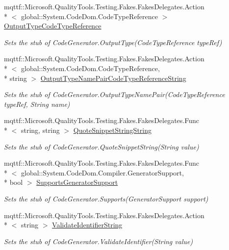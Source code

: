 \begin{DoxyCompactItemize}
mqttf\-::\-Microsoft.\-Quality\-Tools.\-Testing.\-Fakes.\-Fakes\-Delegates.\-Action\\*
$<$ global\-::\-System.\-Code\-Dom.\-Code\-Type\-Reference $>$ \hyperlink{class_system_1_1_code_dom_1_1_compiler_1_1_fakes_1_1_stub_code_generator_a0a58e6feed71b50cd8e9b8310b05abb4}{Output\-Type\-Code\-Type\-Reference}
\begin{DoxyCompactList}\small\item\em Sets the stub of Code\-Generator.\-Output\-Type(\-Code\-Type\-Reference type\-Ref)\end{DoxyCompactList}\item 
mqttf\-::\-Microsoft.\-Quality\-Tools.\-Testing.\-Fakes.\-Fakes\-Delegates.\-Action\\*
$<$ global\-::\-System.\-Code\-Dom.\-Code\-Type\-Reference, \\*
string $>$ \hyperlink{class_system_1_1_code_dom_1_1_compiler_1_1_fakes_1_1_stub_code_generator_ac08a49491b242ab94f3ce3cafc81c0b4}{Output\-Type\-Name\-Pair\-Code\-Type\-Reference\-String}
\begin{DoxyCompactList}\small\item\em Sets the stub of Code\-Generator.\-Output\-Type\-Name\-Pair(\-Code\-Type\-Reference type\-Ref, String name)\end{DoxyCompactList}\item 
mqttf\-::\-Microsoft.\-Quality\-Tools.\-Testing.\-Fakes.\-Fakes\-Delegates.\-Func\\*
$<$ string, string $>$ \hyperlink{class_system_1_1_code_dom_1_1_compiler_1_1_fakes_1_1_stub_code_generator_aca2ac1a9f86a09faaf78ca95bb4bb785}{Quote\-Snippet\-String\-String}
\begin{DoxyCompactList}\small\item\em Sets the stub of Code\-Generator.\-Quote\-Snippet\-String(\-String value)\end{DoxyCompactList}\item 
mqttf\-::\-Microsoft.\-Quality\-Tools.\-Testing.\-Fakes.\-Fakes\-Delegates.\-Func\\*
$<$ global\-::\-System.\-Code\-Dom.\-Compiler.\-Generator\-Support, \\*
bool $>$ \hyperlink{class_system_1_1_code_dom_1_1_compiler_1_1_fakes_1_1_stub_code_generator_a3c86c612640bd6b041dd1fea69d46b97}{Supports\-Generator\-Support}
\begin{DoxyCompactList}\small\item\em Sets the stub of Code\-Generator.\-Supports(\-Generator\-Support support)\end{DoxyCompactList}\item 
mqttf\-::\-Microsoft.\-Quality\-Tools.\-Testing.\-Fakes.\-Fakes\-Delegates.\-Action\\*
$<$ string $>$ \hyperlink{class_system_1_1_code_dom_1_1_compiler_1_1_fakes_1_1_stub_code_generator_a95379f74861c55dd79b49be76273d66a}{Validate\-Identifier\-String}
\begin{DoxyCompactList}\small\item\em Sets the stub of Code\-Generator.\-Validate\-Identifier(\-String value)\end{DoxyCompactList}\end{DoxyCompactItemize}
